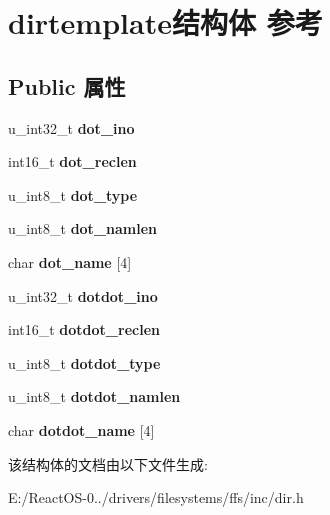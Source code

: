 \hypertarget{structdirtemplate}{}\section{dirtemplate结构体 参考}
\label{structdirtemplate}
\subsection*{Public 属性}
\begin{DoxyCompactItemize}
\item 
\mbox{\label{structdirtemplate_a5cef58f622e47f662c9a26df35085e5c}} 
u\+\_\+int32\+\_\+t {\bfseries dot\+\_\+ino}
\item 
\mbox{\label{structdirtemplate_ac31b7a64eb4f50d72579996c28dfeedd}} 
int16\+\_\+t {\bfseries dot\+\_\+reclen}
\item 
\mbox{\label{structdirtemplate_a9aaff73471587eb111fcb54b1580b78d}} 
u\+\_\+int8\+\_\+t {\bfseries dot\+\_\+type}
\item 
\mbox{\label{structdirtemplate_a10c1283e1ffc58b7168b4b049de7deb9}} 
u\+\_\+int8\+\_\+t {\bfseries dot\+\_\+namlen}
\item 
\mbox{\label{structdirtemplate_a4f05719f0e5a93594345ab2d9d03901e}} 
char {\bfseries dot\+\_\+name} \mbox{[}4\mbox{]}
\item 
\mbox{\label{structdirtemplate_a0b229477147eecd05a98bf223908c00b}} 
u\+\_\+int32\+\_\+t {\bfseries dotdot\+\_\+ino}
\item 
\mbox{\label{structdirtemplate_ad057852d56e4447041f06c6379b08346}} 
int16\+\_\+t {\bfseries dotdot\+\_\+reclen}
\item 
\mbox{\label{structdirtemplate_a95c3c40f2a42a456fd63bdac21ee132b}} 
u\+\_\+int8\+\_\+t {\bfseries dotdot\+\_\+type}
\item 
\mbox{\label{structdirtemplate_a3454becb501850b00f3dc348c70535ab}} 
u\+\_\+int8\+\_\+t {\bfseries dotdot\+\_\+namlen}
\item 
\mbox{\label{structdirtemplate_adb0bac44ca740899ab7a7d225481c82d}} 
char {\bfseries dotdot\+\_\+name} \mbox{[}4\mbox{]}
\end{DoxyCompactItemize}


该结构体的文档由以下文件生成\+:\begin{DoxyCompactItemize}
\item 
E\+:/\+React\+O\+S-\/0../drivers/filesystems/ffs/inc/dir.\+h\end{DoxyCompactItemize}
